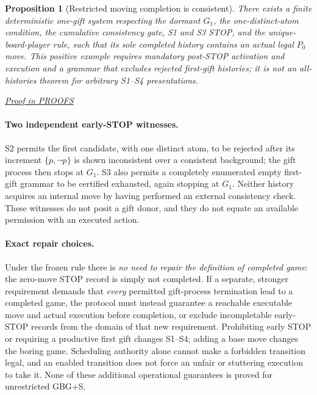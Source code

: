 \documentclass[11pt,letterpaper]{article}
\newtheorem{proposition}[theorem]{Proposition}
\theoremstyle{definition}\newtheorem{definition}[theorem]{Definition}\newtheorem{example}[theorem]{Example}
\theoremstyle{remark}\newtheorem{remark}[theorem]{Remark}
\newcommand{\prooflink}[1]{\par\noindent\hfill\small\hyperref[#1]{\textit{Proof in PROOFS}}\normalsize}
\begin{document}
\begin{proposition}[Restricted moving completion is consistent]\label{br:prop:moving-completion}
There exists a finite deterministic one-gift system respecting the dormant
$G_1$, the one-distinct-atom condition, the cumulative consistency gate,
S1 and S3 STOP, and the unique-board-player rule, such that its sole
completed history contains an actual legal $P_0$ move. This positive
example requires mandatory post-STOP activation and execution and a
grammar that excludes rejected first-gift histories; it is not an
all-histories theorem for arbitrary S1--S4 presentations.
\prooflink{br:pr:moving-completion}
\end{proposition}

\paragraph{Two independent early-STOP witnesses.}
S2 permits the first candidate, with one distinct atom, to be rejected after
its increment $\{p,\neg p\}$ is shown inconsistent over a consistent
background; the gift process then stops at $G_1$. S3 also permits a
completely enumerated empty first-gift grammar to be certified exhausted,
again stopping at $G_1$. Neither history acquires an internal move by having
performed an external consistency check. These witnesses do not posit a gift
donor, and they do not equate an available permission with an executed action.

\paragraph{Exact repair choices.}
Under the frozen rule there is \emph{no need to repair the definition of
completed game}: the zero-move STOP record is simply not completed. If a
separate, stronger requirement demands that \emph{every} permitted gift-process
termination lead to a completed game, the protocol must instead guarantee a
reachable executable move and actual execution before completion, or exclude
incompletable early-STOP records from the domain of that new requirement.
Prohibiting early STOP or requiring a productive first gift changes S1--S4;
adding a base move changes the boring game. Scheduling authority alone cannot
make a forbidden transition legal, and an enabled transition does not force
an unfair or stuttering execution to take it. None of these additional
operational guarantees is proved for unrestricted GBG+S.
\end{document}
